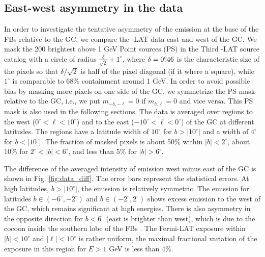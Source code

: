 \subsection{East-west  asymmetry in the data}
\label{sec:data_diff}

In order to investigate the tentative asymmetry of the emission at the base of the FBs relative to the GC, 
we compare the \Fermi-LAT data east and west of the GC. 
We mask the 200 brightest above 1 GeV Point sources (PS) in the Third \Fermi-LAT source catalog \citep[3FGL,][]{2015ApJS..218...23A}
with a circle of radius $\frac{\delta}{\sqrt{2}} + 1^\circ$, where $\delta = 0^\circ\!\!.46$ is the characteristic size of the pixels
so that ${\delta}/{\sqrt{2}}$ is half of the pixel diagonal (if it where a square), while $1^\circ$ is comparable to 68\% containment
around 1 GeV.
In order to avoid possible bias by masking more pixels on one side of the GC,
we symmetrize the PS mask relative to the GC, i.e., we put $m_{-b, -\ell} = 0$ if $m_{b, \ell} = 0$ and vice versa.
This PS mask is also used in the following sections. 
The data is averaged over regions to the west ($0^\circ < \ell < 10^\circ$) and to the east ($-10^\circ < \ell  <  0^\circ$) 
of the GC at different latitudes. The regions have a latitude width of $10^\circ$ for $b >|10^\circ|$ and a width of  $4^\circ$ for  $b <|10^\circ|$. 
The fraction of masked pixels is about 50\% within $|b| < 2^\circ$, about 10\% for $2^\circ < |b| < 6^\circ$, and less than  5\% 
for $|b| > 6^\circ$.

The difference of the averaged intensity of emission west minus east of the GC is shown in Fig. \ref{fig:data_diff}. 
The error bars represent the statistical errors.
At high latitudes, $b >|10^\circ|$, the emission is relatively symmetric. 
The emission for latitudes $b \in (-6^\circ, -2^\circ)$ and $b \in (-2^\circ, 2^\circ)$ shows excess emission to the west of the GC, 
which remains significant at high energies. 
There is also asymmetry in the opposite direction for $b < 6^\circ$ (east is brighter than west), which is due to the cocoon inside the 
southern lobe of the FBs \citep{2012ApJ...753...61S, 2014ApJ...793...64A}.
The Fermi-LAT exposure within $|b| < 10^\circ$ and $|\ell| < 10^\circ$ is rather uniform, 
the maximal fractional variation of the exposure in this region for $E > 1$ GeV is less than 4\%.

